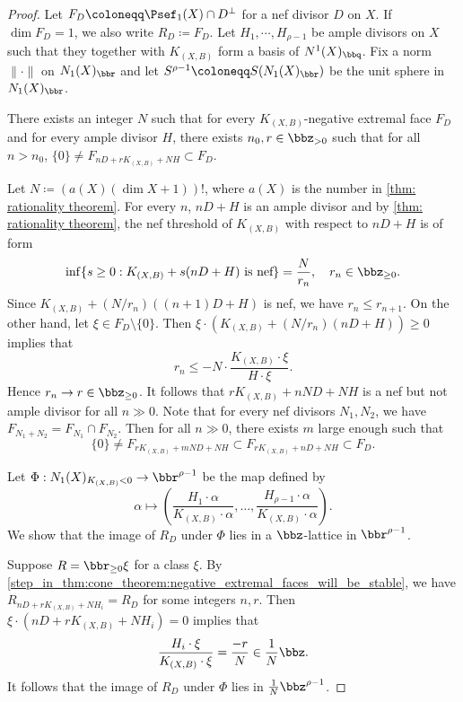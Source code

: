     \begin{proof}
        Let \(F_D \coloneqq \Psef_1(X) \cap D^\perp\) for a nef divisor \(D\) on \(X\).
        If \(\dim F_D = 1\), we also write \(R_D \coloneqq F_D\).
        Let \(H_1,\cdots,H_{\rho-1}\) be ample divisors on \(X\) such that they together with \(K_{(X,B)}\) form a basis of \(N^1(X)_\bbq\).
        Fix a norm \(\|\cdot\|\) on \(N_1(X)_\bbr\) and let \(S^{\rho-1} \coloneqq S(N_1(X)_\bbr)\) be the unit sphere in \(N_1(X)_\bbr\).
        
        \begin{step}\label{step_in_thm:cone_theorem:negative_extremal_faces_will_be_stable}
            There exists an integer \(N\) such that for every \(K_{(X,B)}\)-negative extremal face \(F_D\) and for every ample divisor \(H\), 
            there exists \(n_0, r \in \bbz_{>0}\) such that for all \(n>n_0\), \(\{0\} \neq F_{nD+rK_{(X,B)}+N H} \subset F_D\). 
        \end{step}
        Let \(N \coloneqq (a(X)(\dim X + 1))!\), where \(a(X)\) is the number in \cref{thm: rationality theorem}.
        For every \(n\), \(nD+H\) is an ample divisor and by \cref{thm: rationality theorem}, the nef threshold of \(K_{(X,B)}\) with respect to \(nD+H\) is of form
        \[ \inf \{s \geq 0: K_{(X,B)} + s(nD+H) \text{ is nef}\} = \frac{N}{r_n}, \quad r_n \in \bbz_{\geq 0}. \]
        Since \(K_{(X,B)} + (N/r_n)((n+1)D+H)\) is nef, we have \(r_{n} \leq r_{n+1}\).
        On the other hand, let \(\xi \in F_{D}\setminus \{0\}\). 
        Then \(\xi \cdot (K_{(X,B)} + (N/r_n)(nD+H)) \geq 0\) implies that
        \[ r_n \leq - N \cdot \frac{K_{(X,B)}\cdot \xi}{H \cdot \xi}. \]
        Hence \(r_n \to r \in \bbz_{\geq 0}\).
        It follows that \(rK_{(X,B)}+nND+NH\) is a nef but not ample divisor for all \(n \gg 0\).
        Note that for every nef divisors \(N_1,N_2\), we have \(F_{N_1+N_2} = F_{N_1} \cap F_{N_2}\).
        Then for all \(n \gg 0\), there exists \(m\) large enough such that
        \[ \{0\} \neq F_{rK_{(X,B)}+mND+N H} \subset F_{rK_{(X,B)}+nD+NH} \subset F_D. \]

        \begin{step}\label{step_in_thm:cone_theorem:nagetive_extremal_rays_form_a_lattice}
            Let \(\Phi: N_1(X)_{K_{(X,B)}<0} \to \bbr^{\rho-1}\) be the map defined by 
            \[ \alpha \mapsto \left( \frac{H_1 \cdot \alpha}{K_{(X,B)}\cdot \alpha},\ldots, \frac{H_{\rho-1} \cdot \alpha}{K_{(X,B)}\cdot \alpha}\right). \]
            We show that the image of \(R_D\) under \(\Phi\) lies in a \(\bbz\)-lattice in \(\bbr^{\rho-1}\).
        \end{step}
        Suppose \(R = \bbr_{\geq 0}\xi\) for a class \(\xi\).
        By \cref{step_in_thm:cone_theorem:negative_extremal_faces_will_be_stable}, we have \(R_{nD+rK_{(X,B)}+N H_i} = R_{D}\) for some integers \(n,r\).
        Then \( \xi \cdot (nD+rK_{(X,B)}+N H_i) = 0 \) implies that
        \[ \frac{H_i \cdot \xi}{K_{(X,B)}\cdot \xi} = \frac{-r}{N} \in \frac{1}{N}\bbz. \]
        It follows that the image of \(R_D\) under \(\Phi\) lies in \(\frac{1}{N} \bbz^{\rho-1}\).


\end{proof}
